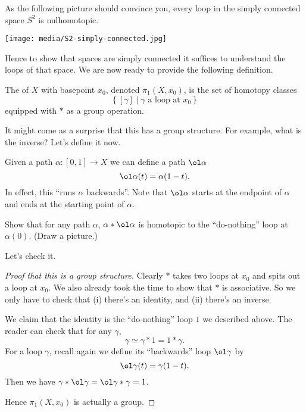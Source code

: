 \begin{example}
	As the following picture should convince you, every loop in
	the simply connected space $S^2$ is nulhomotopic.
	\begin{center}
		\texttt{[image: media/S2-simply-connected.jpg]}
	\end{center}
\end{example}

Hence to show that spaces are simply connected it suffices to understand
the loops of that space.
We are now ready to provide the following definition.
\begin{definition}
	The  of $X$ with basepoint $x_0$,
	denoted $\pi_1(X, x_0)$, is the set of homotopy classes
	\[ \left\{ [\gamma] \mid \gamma \text{ a loop at $x_0$} \right\} \]
	equipped with $\ast$ as a group operation.
\end{definition}

It might come as a surprise that this has a group structure.
For example, what is the inverse?
Let's define it now.
\begin{definition}
	Given a path $\alpha : [0,1] \to X$ we can define a path $\ol\alpha$
	\[ \ol\alpha (t) = \alpha(1-t). \]
	In effect, this ``runs $\alpha$ backwards''.
	Note that $\ol\alpha$ starts at the endpoint of $\alpha$
	and ends at the starting point of $\alpha$.
\end{definition}
\begin{exercise}
	Show that for any path $\alpha$,
	$\alpha \ast \ol\alpha$ is homotopic
	to the ``do-nothing'' loop at $\alpha(0)$.
	(Draw a picture.)
\end{exercise}

Let's check it.
\begin{proof}
	[Proof that this is a group structure]
	Clearly $\ast$ takes two loops at $x_0$ and spits out a loop at $x_0$.
	We also already took the time to show that $\ast$ is associative.
	So we only have to check that (i) there's an identity, and (ii)
	there's an inverse.
	\begin{itemize}
		\ii We claim that the identity is the ``do-nothing'' loop $1$
		we described above. The reader can check that for any $\gamma$,
		\[ \gamma \simeq \gamma \ast 1 = 1 \ast \gamma. \]
		\ii For a loop $\gamma$, recall again we define its ``backwards'' loop $\ol\gamma$ by
		\[ \ol\gamma(t) = \gamma(1-t). \]
		Then we have $\gamma \ast \ol\gamma = \ol\gamma \ast \gamma = 1$.
	\end{itemize}
	Hence $\pi_1(X,x_0)$ is actually a group.
\end{proof}

